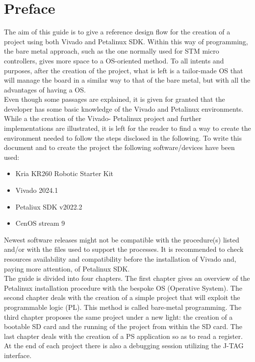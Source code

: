 \chapter*{Preface}
The aim of this guide is to give a reference design flow for the creation of a project using both Vivado and Petalinux SDK. Within this way of programming, the bare metal approach, such as the one normally used for STM micro controllers, gives more space to a OS-oriented method. To all intents and purposes, after the creation of the project, what is left is a tailor-made OS that will manage the board in a similar way to that of the bare metal, but with all the advantages of having a OS.
\bigskip
\\Even though some passages are explained, it is given for granted that the developer has some basic knowledge of the Vivado and Petalinux environments. While a the creation of the Vivado- Petalinux project and further implementations are illustrated, it is left for the reader to find a way to create the environment needed to follow the steps disclosed in the following. To write this document and to create the project the following software/devices have been used:
\begin{itemize}
	\item Kria KR260 Robotic Starter Kit
	\item Vivado 2024.1
	\item Petaliux SDK v2022.2
	\item CenOS stream 9
\end{itemize}
Newest software releases might not be compatible with the procedure(s) listed and/or with the files used to support the processes. It is recommended to check resources availability and compatibility before the installation of Vivado and, paying more attention, of Petalinux SDK.
\bigskip
\\The guide is divided into four chapters. The first chapter gives an overview of the Petalinux installation procedure with the bespoke OS (Operative System). The second chapter deals with the creation of a simple project that will exploit the programmable logic (PL). This method is called bare-metal programming. The third chapter proposes the same project under a new light: the creation of a bootable SD card and the running of the project from within the SD card. The last chapter deals with the creation of a PS application so as to read a register. At the end of each project there is also a debugging session utilizing the J-TAG interface.